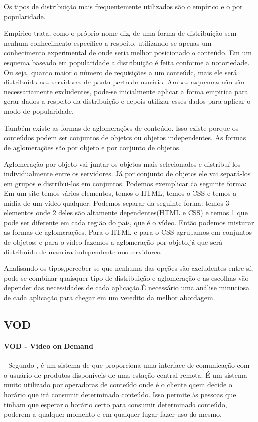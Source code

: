 Os tipos de distribui\c{c}\~ao mais frequentemente utilizados s\~ao o emp\'irico e o por popularidade.

Emp\'irico trata, como o pr\'oprio nome diz, de uma forma de distribui\c{c}\~ao sem nenhum conhecimento espec\'ifico a respeito, utilizando-se apenas um conhecimento experimental de onde seria melhor posicionado o conte\'udo.
 Em um esquema baseado em popularidade a distribui\c{c}\~ao \'e feita conforme a notoriedade. Ou seja, quanto maior o n\'umero de requisi\c{c}\~oes a um conte\'udo, mais ele ser\'a distribu\'ido nos servidores de ponta perto do usu\'ario.
 Ambos esquemas n\~ao s\~ao necessariamente excludentes, pode-se inicialmente aplicar a forma empir\'ica para gerar dados a respeito da distribui\c{c}\~ao e depois utilizar esses dados para aplicar o modo de popularidade.
	
Tamb\'em existe as formas de aglomera\c{c}\~oes de conte\'udo. Isso existe porque os conte\'udos podem ser conjuntos de objetos ou objetos independentes. 
As formas de aglomera\c{c}\~oes s\~ao por objeto e por conjunto de objetos.

Aglomera\c{c}\~ao por objeto vai juntar os objetos mais selecionados e distribu\'i-los individualmente entre os servidores. J\'a por conjunto de objetos ele vai separ\'a-los em grupos e distribui-los em conjuntos. 
 Podemos exemplicar da seguinte forma: Em um site temos v\'arios elementos, temos o HTML, temos o CSS e temos a m\'idia de um v\'ideo qualquer. Podemos separar da seguinte forma: temos 3 elementos onde 2 deles s\~ao altamente dependentes(HTML e CSS) e temos 1 que pode ser diferente em cada regi\~ao do pa\'is, que \'e o v\'ideo. 
 Ent\~ao podemos misturar as formas de aglomera\c{c}\~oes. Para o HTML e para o CSS agrupamos em conjuntos de objetos; e para o v\'ideo fazemos a aglomera\c{c}\~ao por objeto,j\'a que ser\'a distribu\'ido de maneira independente nos servidores.

Analisando os tipos,perceber-se que nenhuma das op\c{c}\~oes s\~ao excludentes entre s\'i, pode-se combinar quaisquer tipo de distribui\c{c}\~ao e aglomera\c{c}\~ao e as escolhas v\~ao depender das necessidades de cada aplica\c{c}\~ao.\'E necess\'ario uma an\'alise minuciosa de cada aplica\c{c}\~ao para chegar em um veredito da melhor abordagem.
\subsection{VOD}
\label{subsec:vod}
\paragraph{VOD - Video on Demand} - Segundo \cite{garfinkle1996video}, \'e um sistema de que proporciona uma interface de comunica\c{c}\~ao com o usu\'ario de produtos dispon\'iveis de uma esta\c{c}\~ao central remota.
 \'E um sistema muito utilizado por operadoras de conte\'udo onde \'e o cliente quem decide o hor\'ario que ir\'a consumir determinado conte\'udo.
 Isso permite \`as pessoas que tinham que esperar o hor\'ario certo para consumir determinado conte\'udo, poderem a qualquer momento e em qualquer lugar fazer uso do mesmo.
